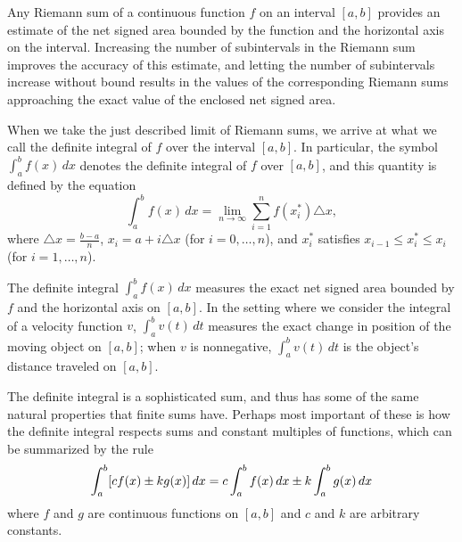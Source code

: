 
\begin{summary}
\item Any Riemann sum of a continuous function $f$ on an interval $[a,b]$ provides an estimate of the net signed area bounded by the function and the horizontal axis on the interval.  Increasing the number of subintervals in the Riemann sum improves the accuracy of this estimate, and letting the number of subintervals increase without bound results in the values of the corresponding Riemann sums approaching the exact value of the enclosed net signed area.

\item When we take the just described limit of Riemann sums, we arrive at what we call the definite integral of $f$ over the interval $[a,b]$.  In particular, the symbol $\int_a^b f(x) \, dx$ denotes the definite integral of $f$ over $[a,b]$, and this quantity is defined by the equation
\[ \int_a^b f(x) \, dx = \lim_{n \to \infty} \sum_{i=1}^{n} f(x_i^*) \triangle x, \]
where $\triangle x = \frac{b-a}{n}$, $x_i = a + i\triangle x$ (for $i = 0, \ldots, n$), and $x_i^*$ satisfies $x_{i-1} \le x_i^* \le x_i$ (for $i = 1, \ldots, n$).

\item The definite integral $\int_a^b f(x) \,dx$ measures the exact net signed area bounded by $f$ and the horizontal axis on $[a,b]$. %
In the setting where we consider the integral of a velocity function $v$, $\int_a^b v(t) \,dt$ measures the exact change in position of the moving object on $[a,b]$; when $v$ is nonnegative, $\int_a^b v(t) \,dt$ is the object's distance traveled on $[a,b]$.  

\item The definite integral is a sophisticated sum, and thus has some of the same natural properties that finite sums have.  Perhaps most important of these is how the definite integral respects sums and constant multiples of functions, which can be summarized by the rule
\[ \displaystyle \int_a^b [c f(x) \pm k g(x)] \,dx = c \int_a^b f(x) \,dx \pm k \int_a^b g(x) \,dx \]
where $f$ and $g$ are continuous functions on $[a,b]$ and $c$ and $k$ are arbitrary constants.
\end{summary}

\clearpage

 

\cleardoublepage